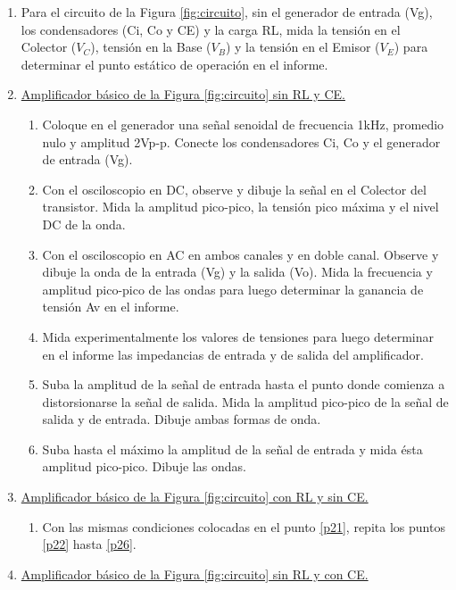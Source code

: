 \documentclass[10pt, a4paper]{article}
\begin{document}
    \begin{enumerate}
        \item Para el circuito de la Figura \ref{fig:circuito}, sin el generador de entrada (Vg), los condensadores (Ci, Co y CE) y la carga RL, mida la tensión en el Colector ($V_C$), tensión en la Base ($V_B$) y la tensión en el Emisor ($V_E$) para determinar el punto estático de operación en el informe.
        \item \underline{Amplificador básico de la Figura \ref{fig:circuito} sin RL y CE.}
        \begin{enumerate}
            \item Coloque en el generador una señal senoidal de frecuencia 1kHz, promedio nulo y amplitud 2Vp-p. Conecte los condensadores Ci, Co y el generador de entrada (Vg).\label{p21}
            \item Con el osciloscopio en DC, observe y dibuje la señal en el Colector del transistor. Mida la amplitud pico-pico, la tensión pico máxima y el nivel DC de la onda. \label{p22}
            \item Con el osciloscopio en AC en ambos canales y en doble canal. Observe y dibuje la onda de la entrada (Vg) y la salida (Vo). Mida la frecuencia y amplitud pico-pico de las ondas para luego determinar la ganancia de tensión Av en el informe.
            \item Mida experimentalmente los valores de tensiones para luego determinar en el informe las impedancias de entrada y de salida del amplificador.
            \item Suba la amplitud de la señal de entrada hasta el punto donde comienza a distorsionarse la señal de salida. Mida la amplitud pico-pico de la señal de salida y de entrada. Dibuje ambas formas de onda.
            \item Suba hasta el máximo la amplitud de la señal de entrada y mida ésta amplitud pico-pico. Dibuje las ondas. \label{p26}
        \end{enumerate}
        \item \underline{Amplificador básico de la Figura \ref{fig:circuito} con RL y sin CE.}
        \begin{enumerate}
            \item Con las mismas condiciones colocadas en el punto \ref{p21}, repita los puntos \ref{p22} hasta \ref{p26}.
        \end{enumerate}
        \item \underline{Amplificador básico de la Figura \ref{fig:circuito} sin RL y con CE.}

\end{enumerate}
\end{document}
